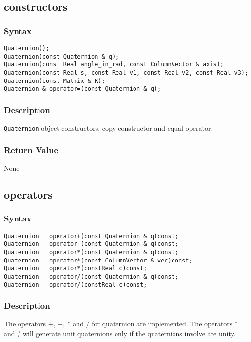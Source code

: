 \documentclass[dvips,11pt,fleqn]{report}
\begin{document}
\subsection*{constructors}

\subsubsection*{Syntax}
\begin{verbatim}
Quaternion();
Quaternion(const Quaternion & q);
Quaternion(const Real angle_in_rad, const ColumnVector & axis);
Quaternion(const Real s, const Real v1, const Real v2, const Real v3);
Quaternion(const Matrix & R);
Quaternion & operator=(const Quaternion & q);
\end{verbatim}
\subsubsection{Description}
\texttt{Quaternion} object constructors, copy constructor and equal operator.

\subsubsection*{Return Value}

None

\newpage

\subsection*{operators}

\subsubsection*{Syntax}
\begin{verbatim}
Quaternion   operator+(const Quaternion & q)const;
Quaternion   operator-(const Quaternion & q)const;
Quaternion   operator*(const Quaternion & q)const;
Quaternion   operator*(const ColumnVector & vec)const;
Quaternion   operator*(constReal c)const;
Quaternion   operator/(const Quaternion & q)const;
Quaternion   operator/(constReal c)const;
\end{verbatim}
\subsubsection{Description}
The operators $+$, $-$, $*$ and $/$ for quaternion are
implemented.
The operators $*$ and $/$ will generate unit quaternions 
only if the quaternions involve are unity.
\end{document}
